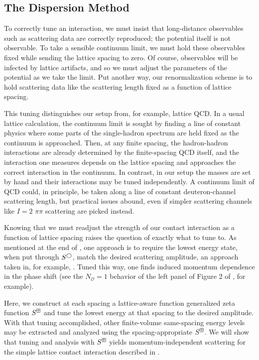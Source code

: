 \subsection{The Dispersion Method}\label{sec:dispersion}

To correctly tune an interaction, we must insist that long-distance observables such as scattering data are correctly reproduced; the potential itself is not observable.
To take a sensible continuum limit, we must hold these observables fixed while sending the lattice spacing to zero.
Of course, observables will be infected by lattice artifacts, and so we must adjust the parameters of the potential as we take the limit.
Put another way, our renormalization scheme is to hold scattering data like the scattering length fixed as a function of lattice spacing.

This tuning distinguishes our setup from, for example, lattice QCD.
In a usual lattice calculation, the continuum limit is sought by finding a line of constant physics where some parts of the single-hadron spectrum are held fixed as the continuum is approached.
Then, at any finite spacing, the hadron-hadron interactions are already determined by the finite-spacing QCD itself, and the interaction one measures depends on the lattice spacing and approaches the correct interaction in the continuum.
In contrast, in our setup the masses are set by hand and their interactions may be tuned independently.
A continuum limit of QCD could, in principle, be taken along a line of constant deuteron-channel scattering length, but practical issues abound, even if simpler scattering channels like $I=2$ $\pi\pi$ scattering are picked instead.

Knowing that we must readjust the strength of our contact interaction as a function of lattice spacing raises the question of exactly what to tune to.
As mentioned at the end of , one approach is to require the lowest energy state, when put through $S^{\bigcirc}$, match the desired scattering amplitude, an approach taken in, for example, .
Tuned this way, one finds induced momentum dependence in the phase shift (see the $N_\mathcal{O}=1$ behavior of the left panel of Figure 2 of , for example).

Here, we construct at each spacing a lattice-aware function generalized \Luscher zeta function $S^{\boxplus}$ and tune the lowest energy at that spacing to the desired amplitude.
With that tuning accomplished, other finite-volume same-spacing energy levels may be extracted and analyzed using the spacing-appropriate $S^{\boxplus}$.
We will show that tuning and analysis with $S^{\boxplus}$ yields momentum-independent scattering for the simple lattice contact interaction described in .

